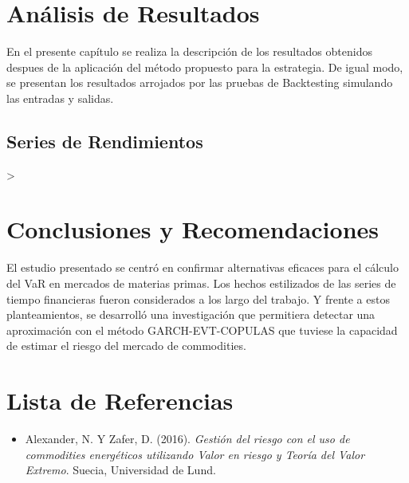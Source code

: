 \documentclass[a4paper,12pt]{Latex/Classes/PhDthesisPSnPDF}
\begin{document}

\chapter{Análisis de Resultados}

En el presente capítulo se realiza la descripción de los resultados obtenidos despues de la aplicación del método propuesto para la estrategia. De igual modo, se presentan los resultados arrojados por las pruebas de Backtesting simulando las entradas y salidas.

\section{Series de Rendimientos}



\begin{Schunk}
\begin{Sinput}
> 
\end{Sinput}
\end{Schunk}





\chapter*{Conclusiones y Recomendaciones}

El estudio presentado se centró en confirmar alternativas eficaces para el cálculo del VaR en mercados de materias primas. Los hechos estilizados de las series de tiempo financieras fueron considerados a los largo del trabajo. Y frente a estos planteamientos, se desarrolló una investigación que permitiera detectar una aproximación con el método GARCH-EVT-COPULAS que tuviese la capacidad de estimar el riesgo del mercado de commodities.\\


\chapter*{Lista de Referencias}

\begin{itemize}

\item Alexander, N. Y Zafer, D. (2016). \textit{Gestión del riesgo con el uso de commodities energéticos utilizando Valor en riesgo y Teoría del Valor Extremo}. Suecia, Universidad de Lund.

\end{itemize}
\end{document}
